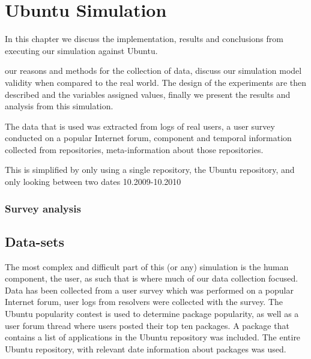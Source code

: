 
\chapter{Ubuntu Simulation}
\label{ubunutsimulation}
In this chapter we discuss the implementation, results and conclusions from executing our simulation against Ubuntu.

{}our reasons and methods for the collection of data,
{}discuss our simulation model validity when compared to the real world.
{}The design of the experiments are then described and the variables assigned values,
{}finally we present the results and analysis from this simulation.

{}The data that is used was extracted from logs of real users, a user survey conducted on a popular Internet forum, 
{}component and temporal information collected from repositories, meta-information about those repositories.


{}This is simplified by only using a single repository, the Ubuntu repository, and only looking between two dates 10.2009-10.2010


\subsection{Survey analysis}




\section{Data-sets}
The most complex and difficult part of this (or any) simulation is the human component, the user,
as such that is where much of our data collection focused.
Data has been collected from
a user survey which was performed on a popular Internet forum,
user logs from resolvers were collected with the survey.
The Ubuntu popularity contest is used to determine package popularity,
as well as a user forum thread where users posted their top ten packages.
A package that contains a list of applications in the Ubuntu repository was included.
The entire Ubuntu repository, with relevant date information about packages was used.

